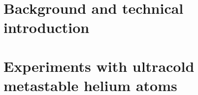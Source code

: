 \documentclass[12pt,a4paper,twoside]{book}
\begin{document}
\frontmatter


\singlespacing



\setcounter{tocdepth}{1}
\tableofcontents

\onehalfspacing

\mainmatter




\part{Background and technical introduction}



\part{Experiments with ultracold metastable helium atoms}






\cleardoublepage
{}
\singlespacing
\printbibliography
{}

\appendix

\end{document}
